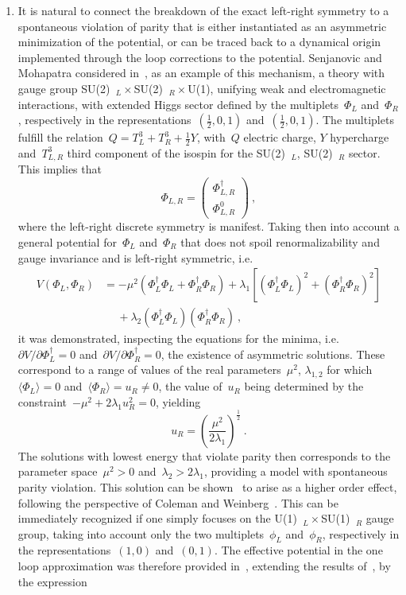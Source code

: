 \documentclass[reqno,11pt]{amsart}
\numberwithin{equation}{section}
\newcommand{\1}{\mbox{\rm 1 \hspace{-1.05 em} 1}}
\newcommand{\U}{{\rm{U}}}
\newcommand{\SU}{{\rm{SU}}}
\begin{document}
\begin{enumerate}[leftmargin=2em]
\item
It is natural to connect the breakdown of the exact left-right symmetry to a spontaneous violation of parity that is either instantiated as an asymmetric minimization of the potential, or can be traced back to a dynamical origin implemented through the loop corrections to the potential. Senjanovic and Mohapatra considered in~\cite{Senjanovic:1975rk}, as an example of this mechanism, a theory with gauge group \SU(2)$\!\!\!\phantom{a}_L\times$\SU(2)$\!\!\!\phantom{a}_R\times$U(1), unifying weak and electromagnetic interactions, with extended Higgs sector defined by the multiplets~$\Phi_L$ and~$\Phi_R$, respectively in the representations~$(\frac{1}{2},0,1)$ and~$(\frac{1}{2},0,1)$. The multiplets fulfill the relation~$Q=T^3_L+T^3_R+\frac{1}{2}Y$, with~$Q$ electric charge, $Y$ hypercharge and~$T^3_{L ,R}$ third component of the isospin for the \SU(2)$\!\!\!\phantom{a}_L$, \SU(2)$\!\!\!\phantom{a}_R$ sector. This implies that
\[ \Phi_{L ,  R}= \begin{pmatrix} \Phi^{\dagger}_{L ,  R} \\ \Phi^0_{L ,  R} \end{pmatrix} \:, \]
where the left-right discrete symmetry is manifest. Taking then into account a general potential for~$\Phi_L$ and~$\Phi_R$ that does not spoil renormalizability and gauge invariance and is left-right symmetric, i.e.  
\begin{align*}
V(\Phi_L, \Phi_R) &= -\mu^2 \left( \Phi_L^\dagger \Phi_L + \Phi_R^\dagger \Phi_R \right) + \lambda_1 \left[ (\Phi_L^\dagger \Phi_L)^2 + (\Phi_R^\dagger \Phi_R)^2 \right] \nonumber \\
&\quad\: +\lambda_2 (\Phi_L^\dagger \Phi_L) (\Phi_R^\dagger \Phi_R)\:,
\end{align*}
it was demonstrated, inspecting the equations for the minima, i.e.\ $\partial V/\partial \Phi^\dagger_L=0$ and~$\partial V/\partial \Phi^\dagger_R=0$, the existence of asymmetric solutions. These correspond to a range of values of the real parameters~$\mu^2$, $\lambda_{1,2}$ for which~$\langle \Phi_L\rangle=0$ and~$\langle \Phi_R\rangle=u_R\neq 0$, the value of~$u_R$ being determined by the constraint~$-\mu^2+2\lambda_1 u_R^2=0$, yielding
\[ u_R=\left( \frac{\mu^2}{2 \lambda_1} \right)^{\frac{1}{2}} \:. \]
The solutions with lowest energy that violate parity then corresponds to the parameter space~$\mu^2>0$ and~$\lambda_2 > 2 \lambda_1$, providing a model with spontaneous parity violation. This solution can be shown~\cite{Senjanovic:1975rk} to arise as a higher order effect, following the perspective of Coleman and Weinberg~\cite{Coleman:1973jx}. This can be immediately recognized if one simply focuses on the \U(1)$\!\!\!\phantom{a}_L\times$\SU(1)$\!\!\!\phantom{a}_R$ gauge group, taking into account only the two multiplets~$\phi_L$ and~$\phi_R$, respectively in the representations~$(1,0)$ and~$(0,1)$. The effective potential in the one loop approximation was therefore provided in~\cite{Senjanovic:1975rk}, extending the results of~\cite{Coleman:1973jx}, by the expression 

\end{enumerate}
\end{document}
